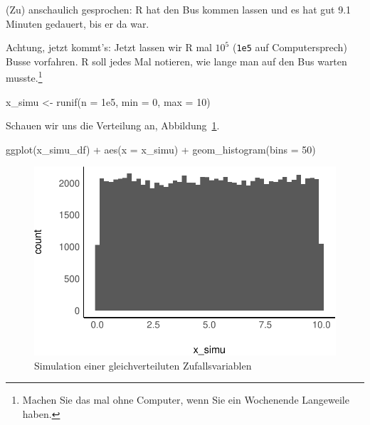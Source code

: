 \documentclass[
  a4paper,
  DIV=11]{scrreprt}
\newenvironment{Shaded}{\begin{snugshade}}{\end{snugshade}}
\newcommand{\AttributeTok}[1]{\textcolor[rgb]{0.40,0.45,0.13}{#1}}
\newcommand{\DecValTok}[1]{\textcolor[rgb]{0.68,0.00,0.00}{#1}}
\newcommand{\FloatTok}[1]{\textcolor[rgb]{0.68,0.00,0.00}{#1}}
\newcommand{\FunctionTok}[1]{\textcolor[rgb]{0.28,0.35,0.67}{#1}}
\newcommand{\NormalTok}[1]{\textcolor[rgb]{0.00,0.23,0.31}{#1}}
\newcommand{\OtherTok}[1]{\textcolor[rgb]{0.00,0.23,0.31}{#1}}
\newcommand{\SpecialCharTok}[1]{\textcolor[rgb]{0.37,0.37,0.37}{#1}}
\theoremstyle{definition}
\theoremstyle{remark}
\begin{document}
(Zu) anschaulich gesprochen: R hat den Bus kommen lassen und es hat gut
9.1 Minuten gedauert, bis er da war.

Achtung, jetzt kommt's: Jetzt lassen wir R mal \(10^5\) (\texttt{1e5}
auf Computersprech) Busse vorfahren. R soll jedes Mal notieren, wie
lange man auf den Bus warten musste.\footnote{Machen Sie das mal ohne
  Computer, wenn Sie ein Wochenende Langeweile haben.}

\begin{Shaded}
\begin{Highlighting}[]
\NormalTok{x\_simu }\OtherTok{\textless{}{-}} \FunctionTok{runif}\NormalTok{(}\AttributeTok{n =} \FloatTok{1e5}\NormalTok{, }\AttributeTok{min =} \DecValTok{0}\NormalTok{, }\AttributeTok{max =} \DecValTok{10}\NormalTok{)}
\end{Highlighting}
\end{Shaded}

Schauen wir uns die Verteilung an, Abbildung~\ref{fig-simu-gleichvert}.

\begin{Shaded}
\begin{Highlighting}[]
\FunctionTok{ggplot}\NormalTok{(x\_simu\_df) }\SpecialCharTok{+}
  \FunctionTok{aes}\NormalTok{(}\AttributeTok{x =}\NormalTok{ x\_simu) }\SpecialCharTok{+}
  \FunctionTok{geom\_histogram}\NormalTok{(}\AttributeTok{bins =} \DecValTok{50}\NormalTok{)}
\end{Highlighting}
\end{Shaded}

\begin{figure}[H]

{\centering \includegraphics{./Verteilungen_files/figure-pdf/fig-simu-gleichvert-1.pdf}

}

\caption{\label{fig-simu-gleichvert}Simulation einer gleichverteiluten
Zufallsvariablen}

\end{figure}
\end{document}
